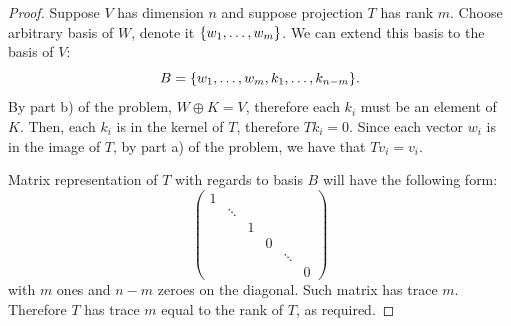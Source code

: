 \documentclass{article}
\theoremstyle{definition}
\DeclarePairedDelimiter\set{\{}{\}}
\begin{document}
\begin{proof}

Suppose $V$ has dimension $n$ and suppose projection $T$ has rank $m$.
Choose arbitrary basis of $W$, denote it $\set{w_1, \dots, w_m}$.
We can extend this basis to the basis of $V$:
\[ B = \set{w_1, \dots, w_m, k_1, \dots, k_{n-m}}. \]
By part b) of the problem, $W \oplus K = V$, therefore each $k_i$ must be an element of $K$.
Then, each $k_i$ is in the kernel of $T$, therefore $T k_i = 0$.
Since each vector $w_i$ is in the image of $T$, by part a) of the problem, we have that $T v_i = v_i$.

Matrix representation of $T$ with regards to basis $B$ will have the following form:
\[
    \begin{pmatrix}
        1 \\
        & \ddots \\
        & & 1 \\
        & & & 0 \\
        & & & & \ddots \\
        & & & & & 0
    \end{pmatrix}
\]
with $m$ ones and $n-m$ zeroes on the diagonal.
Such matrix has trace $m$. Therefore $T$ has trace $m$ equal to the rank of $T$, as required.

\end{proof}
\end{document}
